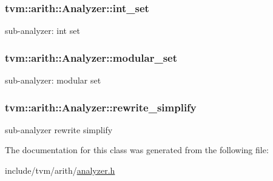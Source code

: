 \subsubsection[{\texorpdfstring{int\+\_\+set}{int_set}}]{ tvm\+::arith\+::\+Analyzer\+::int\+\_\+set}\hypertarget{classtvm_1_1arith_1_1Analyzer_a0d054ea2ea5b7e99f0883c00672ec831}{}\label{classtvm_1_1arith_1_1Analyzer_a0d054ea2ea5b7e99f0883c00672ec831}


sub-\/analyzer\+: int set 

\subsubsection[{\texorpdfstring{modular\+\_\+set}{modular_set}}]{ tvm\+::arith\+::\+Analyzer\+::modular\+\_\+set}\hypertarget{classtvm_1_1arith_1_1Analyzer_acac92a9522deabe289fea99efbd9eaec}{}\label{classtvm_1_1arith_1_1Analyzer_acac92a9522deabe289fea99efbd9eaec}


sub-\/analyzer\+: modular set 

\subsubsection[{\texorpdfstring{rewrite\+\_\+simplify}{rewrite_simplify}}]{ tvm\+::arith\+::\+Analyzer\+::rewrite\+\_\+simplify}\hypertarget{classtvm_1_1arith_1_1Analyzer_acc86c6e8c04cb0de4ff9d78e769924b2}{}\label{classtvm_1_1arith_1_1Analyzer_acc86c6e8c04cb0de4ff9d78e769924b2}


sub-\/analyzer rewrite simplify 



The documentation for this class was generated from the following file\+:\begin{DoxyCompactItemize}
\item 
include/tvm/arith/\hyperlink{analyzer_8h}{analyzer.\+h}\end{DoxyCompactItemize}
